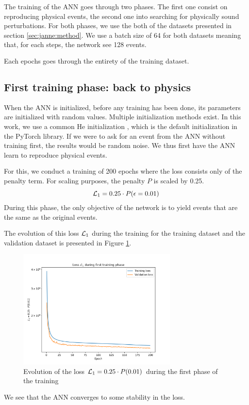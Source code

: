 \documentclass[../main.tex]{subfiles}
\begin{document}
The training of the ANN goes through two phases. The first one consist on reproducing physical events, the second one into searching for physically sound perturbations. For both phases, we use the both of the datasets presented in section \ref{sec:janne:method}. We use a batch size of 64 for both datasets meaning that, for each steps, the network see 128 events.

Each epochs goes through the entirety of the training dataset.

\subsection{First training phase: back to physics}
\label{sec:janne:results:identity}

When the ANN is initialized, before any training has been done, its parameters are initialized with random values. Multiple initialization methods exist. In this work, we use a common He initialization \cite{he_delving_2015}, which is the default initialization in the PyTorch \cite{ansel_pytorch_2024} library. If we were to ask for an event from the ANN without training first, the results would be random noise. We thus first have the ANN learn to reproduce physical events.

For this, we conduct a training of 200 epochs where the loss consists only of the penalty term. For scaling purposes, the penalty $P$ is scaled by 0.25.
\begin{equation}
  {\cal L}_1 = 0.25 \cdot P(\epsilon = 0.01)
\end{equation}
During this phase, the only objective of the network is to yield events that are the same as the original events.


The evolution of this loss ${\cal L}_1$ during the training for the training dataset and the validation dataset is presented in Figure \ref{fig:jann:train:phase_1}.
\begin{figure}[ht]
  \centering
  \includegraphics[height=6cm]{images/janne/training/phase_1_penal.png}
  \caption{Evolution of the loss ${\cal L}_1 = 0.25 \cdot P(0.01)$ during the first phase of the training}
  \label{fig:jann:train:phase_1}
\end{figure}
We see that the ANN converges to some stability in the loss.
\end{document}
